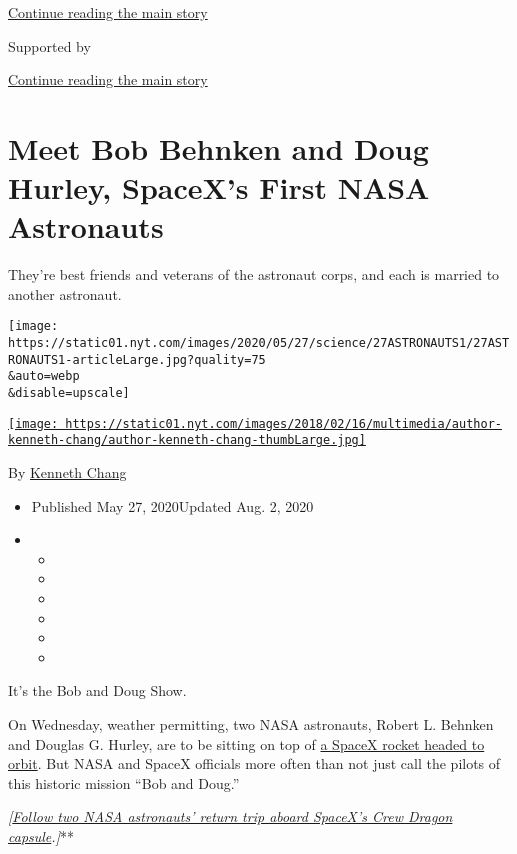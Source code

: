 \protect\hyperlink{after-top}{Continue reading the main story}

Supported by

\protect\hyperlink{after-sponsor}{Continue reading the main story}

\hypertarget{meet-bob-behnken-and-doug-hurley-spacexs-first-nasa-astronauts}{%
\section{Meet Bob Behnken and Doug Hurley, SpaceX's First NASA
Astronauts}\label{meet-bob-behnken-and-doug-hurley-spacexs-first-nasa-astronauts}}

They're best friends and veterans of the astronaut corps, and each is
married to another astronaut.

\texttt{[image: https://static01.nyt.com/images/2020/05/27/science/27ASTRONAUTS1/27ASTRONAUTS1-articleLarge.jpg?quality=75\\\&auto=webp\\\&disable=upscale]}

\href{https://www.nytimes.com/by/kenneth-chang}{\texttt{[image: https://static01.nyt.com/images/2018/02/16/multimedia/author-kenneth-chang/author-kenneth-chang-thumbLarge.jpg]}}

By \href{https://www.nytimes.com/by/kenneth-chang}{Kenneth Chang}

\begin{itemize}
\item
  Published May 27, 2020Updated Aug. 2, 2020
\item
  \begin{itemize}
  \item
  \item
  \item
  \item
  \item
  \item
  \end{itemize}
\end{itemize}

It's the Bob and Doug Show.

On Wednesday, weather permitting, two NASA astronauts, Robert L. Behnken
and Douglas G. Hurley, are to be sitting on top of
\href{https://www.nytimes.com/2020/05/26/science/spacex-launch-nasa.html}{a
SpaceX rocket headed to orbit}. But NASA and SpaceX officials more often
than not just call the pilots of this historic mission ``Bob and Doug.''

\emph{\emph{\emph{{[}}\href{https://www.nytimes.com/2020/08/02/science/spacex-nasa-return.html}{\emph{Follow
two NASA astronauts' return trip aboard SpaceX's Crew Dragon
capsule}}}.{]}}**

